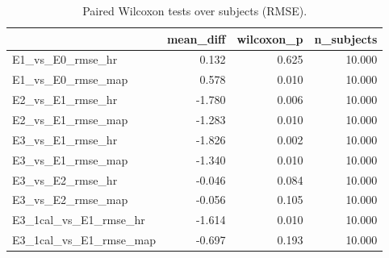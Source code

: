 \begin{table}
\caption{Paired Wilcoxon tests over subjects (RMSE).}
\label{tab:gravity_tests}
\begin{tabular}{lrrr}
\toprule
 & mean_diff & wilcoxon_p & n_subjects \\
\midrule
E1_vs_E0_rmse_hr & 0.132 & 0.625 & 10.000 \\
E1_vs_E0_rmse_map & 0.578 & 0.010 & 10.000 \\
E2_vs_E1_rmse_hr & -1.780 & 0.006 & 10.000 \\
E2_vs_E1_rmse_map & -1.283 & 0.010 & 10.000 \\
E3_vs_E1_rmse_hr & -1.826 & 0.002 & 10.000 \\
E3_vs_E1_rmse_map & -1.340 & 0.010 & 10.000 \\
E3_vs_E2_rmse_hr & -0.046 & 0.084 & 10.000 \\
E3_vs_E2_rmse_map & -0.056 & 0.105 & 10.000 \\
E3_1cal_vs_E1_rmse_hr & -1.614 & 0.010 & 10.000 \\
E3_1cal_vs_E1_rmse_map & -0.697 & 0.193 & 10.000 \\
\bottomrule
\end{tabular}
\end{table}

